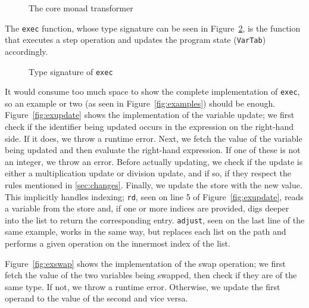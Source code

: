 \begin{figure}[H]
  
  \caption{The core monad transformer}\label{fig:varstate}
\end{figure}

The \texttt{exec} function, whose type signature can be seen in Figure~\ref{fig:exec}, is the function that executes a step operation and updates the program state (\texttt{VarTab}) accordingly.

\begin{figure}[H]
  
  \caption{Type signature of \texttt{exec}}\label{fig:exec}
\end{figure}

It would consume too much space to show the complete implementation of \texttt{exec}, so an example or two (as seen in Figure~\ref{fig:examples}) should be enough. Figure~\ref{fig:exupdate} shows the implementation of the variable update; we first check if the identifier being updated occurs in the expression on the right-hand side. If it does, we throw a runtime error. Next, we fetch the value of the variable being updated and then evaluate the right-hand expression. If one of these is not an integer, we throw an error. Before actually updating, we check if the update is either a multiplication update or division update, and if so, if they respect the rules mentioned in \ref{sec:changes}. Finally, we update the store with the new value. This implicitly handles indexing; \texttt{rd}, seen on line 5 of Figure~\ref{fig:exupdate}, reads a variable from the store and, if one or more indices are provided, digs deeper into the list to return the corresponding entry. \texttt{adjust}, seen on the last line of the same example, works in the same way, but replaces each list on the path and performs a given operation on the innermost index of the list.

Figure~\ref{fig:exswap} shows the implementation of the swap operation; we first fetch the value of the two variables being swapped, then check if they are of the same type. If not, we throw a runtime error. Otherwise, we update the first operand to the value of the second and vice versa.


